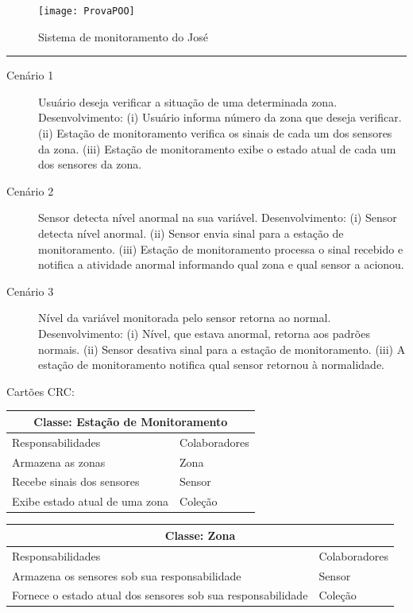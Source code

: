 \documentclass[11pt]{article}
\begin{document}
\begin{itemize}
\begin{figure}[htb]
\begin{center}
\texttt{[image: ProvaPOO]}
\end{center}
\caption{Sistema de monitoramento do José}
\label{fig}
\end{figure}

\hrule
\begin{description}
  \item[Cenário 1] Usuário deseja verificar a situação de uma determinada
  zona. Desenvolvimento: (i) Usuário informa número da zona que deseja verificar. (ii)
  Estação de monitoramento verifica os sinais de cada um dos sensores da zona.
  (iii) Estação de monitoramento exibe o estado atual de cada um dos sensores da
  zona.
  \item[Cenário 2] Sensor detecta nível anormal na sua variável.
  Desenvolvimento: (i) Sensor detecta nível anormal. (ii) Sensor envia sinal
  para a estação de monitoramento. (iii) Estação de monitoramento processa o
  sinal recebido e notifica a atividade anormal informando qual zona e qual
  sensor a acionou.
  \item[Cenário 3] Nível da variável monitorada pelo sensor retorna ao normal.
  Desenvolvimento: (i) Nível, que estava anormal, retorna aos padrões normais.
  (ii) Sensor desativa sinal para a estação de monitoramento. (iii) A estação de
  monitoramento notifica qual sensor retornou à normalidade.
\end{description}

Cartões CRC:

\begin{tabularx}{\textwidth}{|X|X|}
  \hline
  \multicolumn{2}{|c|}{Classe: Estação de Monitoramento} \\
  \hline
  Responsabilidades & Colaboradores \\ \hline
  Armazena as zonas & Zona \\
  Recebe sinais dos sensores & Sensor \\
  Exibe estado atual de uma zona & Coleção \\
  \hline
\end{tabularx}

\begin{tabularx}{\textwidth}{|X|X|}
  \hline
  \multicolumn{2}{|c|}{Classe: Zona} \\
  \hline
  Responsabilidades & Colaboradores \\ \hline
  Armazena os sensores sob sua responsabilidade & Sensor \\
  Fornece o estado atual dos sensores sob sua responsabilidade & Coleção \\
  \hline
\end{tabularx}


\end{itemize}
\end{document}

